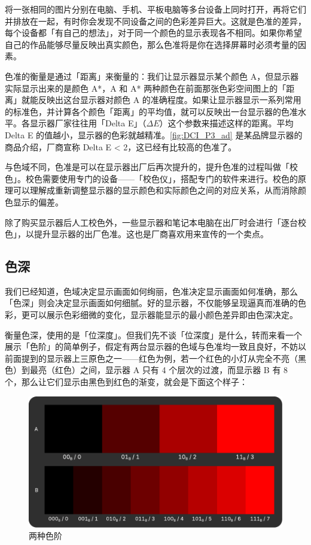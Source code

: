 将一张相同的图片分别在电脑、手机、平板电脑等多台设备上同时打开，再将它们并排放在一起，有时你会发现不同设备之间的色彩差异巨大。这就是色准的差异，每个设备都「有自己的想法」，对于同一个颜色的显示表现各不相同。如果你希望自己的作品能够尽量反映出真实颜色，那么色准将是你在选择屏幕时必须考量的因素。

色准的衡量是通过「距离」来衡量的：我们让显示器显示某个颜色 A，但显示器实际显示出来的是颜色 A*，A 和 A* 两种颜色在前面那张色彩空间图上的「距离」就能反映出这台显示器对颜色 A 的准确程度。如果让显示器显示一系列常用的标准色，并计算各个颜色「距离」的平均值，就可以反映出一台显示器的色准水平。各显示器厂家往往用「Delta E」（$\Delta E$）这个参数来描述这样的距离。平均 Delta E 的值越小，显示器的色彩就越精准。\autoref{fig:DCI_P3_ad} 是某品牌显示器的商品介绍，厂商宣称 Delta E < 2，这已经有比较高的色准了。

与色域不同，色准是可以在显示器出厂后再次提升的，提升色准的过程叫做「校色」。校色需要使用专门的设备——「校色仪」，搭配专门的软件来进行。校色的原理可以理解成重新调整显示器的显示颜色和实际颜色之间的对应关系，从而消除颜色显示的偏差。

除了购买显示器后人工校色外，一些显示器和笔记本电脑在出厂时会进行「逐台校色」，以提升显示器的出厂色准。这也是厂商喜欢用来宣传的一个卖点。

\subsection{色深}

我们已经知道，色域决定显示画面如何绚丽，色准决定显示画面如何准确，那么「色深」则会决定显示画面如何细腻。好的显示器，不仅能够呈现逼真而准确的色彩，更可以展示色彩细微的变化，显示器能显示的最小颜色差异即由色深决定。

衡量色深，使用的是「位深度」。但我们先不谈「位深度」是什么，转而来看一个展示「色阶」的简单例子，假定有两台显示器的色域与色准均一致且良好，不妨以前面提到的显示器上三原色之一——红色为例，若一个红色的小灯从完全不亮（黑色）到最亮（红色）之间，显示器 A 只有 4 个层次的过渡，而显示器 B 有 8 个，那么让它们显示由黑色到红色的渐变，就会是下面这个样子：

\begin{figure}[htb!]
  \centering
  \includegraphics[width=.7\textwidth]{assets/advanced/Color_Gradient.pdf}
  \caption{两种色阶}
  \label{fig:Color_Gradient}
\end{figure}

